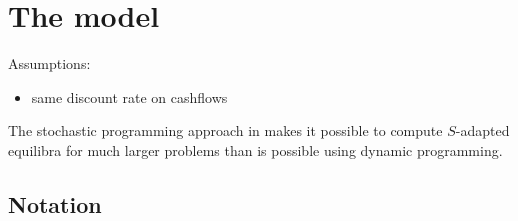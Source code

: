 \section{The model}

Assumptions:

\begin{itemize}
	\item same discount rate on cashflows
\end{itemize}

The stochastic programming approach in \cite{Genc2007} makes it possible to compute $S$-adapted equilibra for much larger problems than is possible using dynamic programming.

\subsection{Notation}

